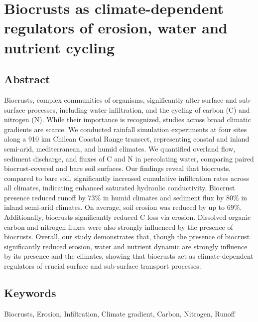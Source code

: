 \chapter{Biocrusts as climate-dependent regulators of erosion, water and nutrient cycling}
\label{chap:manuscript2} %

\section*{Abstract} %

Biocrusts, complex communities of organisms, significantly alter surface and sub-surface processes, including water infiltration, and the cycling of carbon (C) and nitrogen (N). While their importance is recognized, studies across broad climatic gradients are scarce. We conducted rainfall simulation experiments at four sites along a 910 km Chilean Coastal Range transect, representing coastal and inland semi-arid, mediterranean, and humid climates. We quantified overland flow, sediment discharge, and fluxes of C and N in percolating water, comparing paired biocrust-covered and bare soil surfaces. Our findings reveal that biocrusts, compared to bare soil, significantly increased cumulative infiltration rates across all climates, indicating enhanced saturated hydraulic conductivity. Biocrust presence reduced runoff by 73\% in humid climates and sediment flux by 80\% in inland semi-arid climates. On average, soil erosion was reduced by up to 69\%. Additionally, biocrusts significantly reduced C loss via erosion. Dissolved organic carbon and nitrogen fluxes were also strongly influenced by the presence of biocrusts. Overall, our study demonstrates that, though the presence of biocrust significantly reduced erosion, water and nutrient dynamic are strongly influence by its presence and the climates, showing that biocrusts act as climate-dependent regulators of crucial surface and sub-surface transport processes.

\section*{Keywords}

Biocrusts, Erosion, Infiltration, Climate gradient, Carbon, Nitrogen, Runoff

